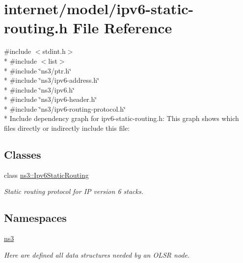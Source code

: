 \hypertarget{ipv6-static-routing_8h}{}\section{internet/model/ipv6-\/static-\/routing.h File Reference}
\label{ipv6-static-routing_8h}
{\ttfamily \#include $<$stdint.\+h$>$}\\*
{\ttfamily \#include $<$list$>$}\\*
{\ttfamily \#include \char`\"{}ns3/ptr.\+h\char`\"{}}\\*
{\ttfamily \#include \char`\"{}ns3/ipv6-\/address.\+h\char`\"{}}\\*
{\ttfamily \#include \char`\"{}ns3/ipv6.\+h\char`\"{}}\\*
{\ttfamily \#include \char`\"{}ns3/ipv6-\/header.\+h\char`\"{}}\\*
{\ttfamily \#include \char`\"{}ns3/ipv6-\/routing-\/protocol.\+h\char`\"{}}\\*
Include dependency graph for ipv6-\/static-\/routing.h\+:
This graph shows which files directly or indirectly include this file\+:
\subsection*{Classes}
\begin{DoxyCompactItemize}
\item 
class \hyperlink{classns3_1_1Ipv6StaticRouting}{ns3\+::\+Ipv6\+Static\+Routing}
\begin{DoxyCompactList}\small\item\em Static routing protocol for IP version 6 stacks. \end{DoxyCompactList}\end{DoxyCompactItemize}
\subsection*{Namespaces}
\begin{DoxyCompactItemize}
\item 
 \hyperlink{namespacens3}{ns3}
\begin{DoxyCompactList}\small\item\em Here are defined all data structures needed by an O\+L\+SR node. \end{DoxyCompactList}\end{DoxyCompactItemize}
